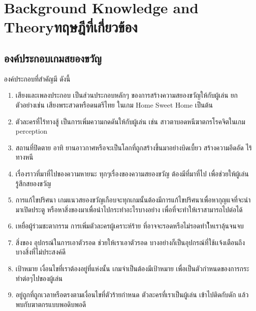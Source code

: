 \chapter{\ifenglish Background Knowledge and Theory\else ทฤษฎีที่เกี่ยวข้อง\fi}


\section{องค์ประกอบเกมสยองขวัญ} \cite{component-horror:theory} องค์ประกอบที่สำคัญมี ดังนี้
\begin{enumerate}
  \item เสียงและเพลงประกอบ เป็นส่วนประกอบหลักๆ ของการสร้างความสยองขวัญให้กับผู้เล่น ยกตัวอย่างเช่น เสียงพระสวดหรือดนตรีไทย ในเกม Home Sweet Home เป็นต้น
  \item ตัวละครที่ไร้ทางสู้ เป็นการเพิ่มความกดดันให้กับผู้เล่น เช่น สาวตาบอดหนีฆาตกรโรคจิตในเกม perception
  \item สถานที่ปิดตาย อาทิ ยานอาวกาศหรือจะเป็นโลกที่ถูกสร้างขึ้นมาอย่างบิดเบี้ยว สร้างความอึดอัด ไร้ทางหนี
  \item เรื่องราวที่มาที่ไปของความหายนะ ทุกๆเรื่องของความสยองขวัญ ต้องมีที่มาที่ไป เพื่อช่วยให้ผู้เล่นรู้สึกสยองขวัญ
  \item การแก้ไขปริศนา เกมแนวสยองขวัญเกือบจะทุกเกมนั้นต้องมีการแก้ไขปริศนาเพื่อหากุญแจที่จะนำมาเปิดประตู หรือหาสิ่งของมาเพื่อนำไปกระทำอะไรบางอย่าง เพื่อที่จะทำให้เราสามารถไปต่อได้
  \item เหยื่อผู้ร่วมชะตากรรม การเพิ่มตัวละครผู้เคราะห์ร้าย ที่อาจจะรอดหรือไม่รอดทำใ้หเราลุ้นจนจบ
  \item สิ่งของ อุปกรณ์ในการเอาตัวรอด ช่วยให้เราเอาตัวรอด บางอย่างก็เป็นอุปกรณ์ที่ใช้เเจ้งเตือนถึงบางสิ่งที่ไม่ประสงค์ดี
  \item เป้าหมาย เงื่อนไขที่เราต้องอยู่ที่แห่งนั้น เกมจำเป็นต้องมีเป้าหมาย เพื่อเป็นตัวกำหนดของการกระทำต่อๆไปของผู้เล่น
  \item อยู่ถูกที่ถูกเวลาหรือตรงตามเงื่อนไขที่ตัวร้ายกำหนด ตัวละครที่เราเป็นผู้เล่น เข้าไปติดกับดัก แล้วพบกับฆาตกรแบบพอดิบพอดี
\end{enumerate}


